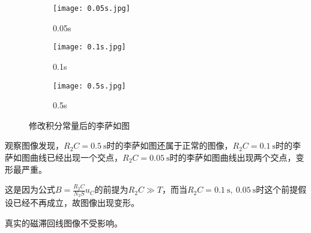 \documentclass[11pt]{article}
\begin{document}
\begin{enumerate}
		\begin{figure}[H]
			\centering
			\begin{subfigure}{0.32\textwidth}
				\texttt{[image: 0.05s.jpg]}
				\caption{0.05s}
			\end{subfigure}
			\begin{subfigure}{0.32\textwidth}
				\texttt{[image: 0.1s.jpg]}
				\caption{0.1s}
			\end{subfigure}
			\begin{subfigure}{0.32\textwidth}
				\texttt{[image: 0.5s.jpg]}
				\caption{0.5s}
			\end{subfigure}
			\caption{修改积分常量后的李萨如图}
			\label{fig:rc}
		\end{figure}
		
		观察图像发现，$R_2 C=0.5\ \mathrm{s}$时的李萨如图还属于正常的图像，$R_2 C=0.1\ \mathrm{s}$时的李萨如图曲线已经出现一个交点，$R_2 C=0.05\ \mathrm{s}$时的李萨如图曲线出现两个交点，变形最严重。
		
		这是因为公式$B = \frac{R_2 C}{N_2 S}u_C$的前提为$R_2 C \gg T$，而当$R_2 C=0.1\ \mathrm{s}, \ 0.05\ \mathrm{s}$时这个前提假设已经不再成立，故图像出现变形。
		
		真实的磁滞回线图像不受影响。
		
	\end{enumerate} 
	
	
\end{document}
